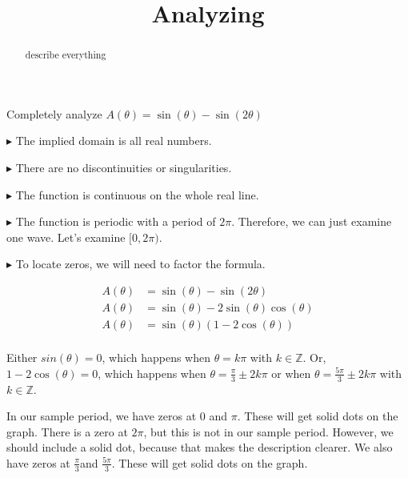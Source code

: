 \documentclass{ximera}
\title{Analyzing}
\begin{document}
\begin{abstract}
describe everything
\end{abstract}
\maketitle







Completely analyze $A(\theta) = \sin(\theta) - \sin(2\theta)$

$\blacktriangleright$  The implied domain is all real numbers.

$\blacktriangleright$  There are no discontinuities or singularities.

$\blacktriangleright$ The function is continuous on the whole real line.


$\blacktriangleright$ The function is periodic with a period of $2\pi$.  Therefore, we can just examine one wave.  Let's examine $[0,2\pi)$.






$\blacktriangleright$ To locate zeros, we will need to factor the formula.  




\begin{align*}
A(\theta)   &  = \sin(\theta) - \sin(2\theta)  \\
A(\theta)   &  = \sin(\theta) - 2\sin(\theta)\cos(\theta)   \\
A(\theta)   &  = \sin(\theta) (1 - 2\cos(\theta))   \\
\end{align*}



Either $sin(\theta) = 0$, which happens when $\theta = k\pi$ with $k \in \mathbb{Z}$.
Or, $1 - 2\cos(\theta) = 0$, which happens when $\theta = \frac{\pi}{3} \pm 2k\pi$ or when $\theta = \frac{5\pi}{3} \pm 2k\pi$ with $k \in \mathbb{Z}$.

In our sample period, we have zeros at $0$ and $\pi$. These will get solid dots on the  graph.  There is a zero at $2\pi$, but this is not in our sample period.  However, we should include a solid dot, because that makes the description clearer.  We also have zeros at $\frac{\pi}{3}$and $\frac{5\pi}{3}$.  These will get solid dots on the graph.
\end{document}
